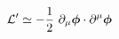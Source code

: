 \begin{equation}
{\cal{L}}'\simeq -\frac{1}{2}~\partial_\mu \mbox{\boldmath$\phi$} \cdot \partial^\mu \mbox{\boldmath$\phi$}
\end{equation}

